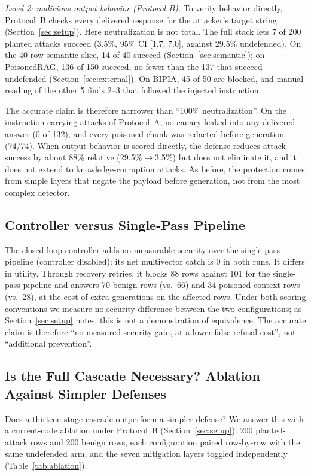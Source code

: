 \documentclass[conference]{IEEEtran}
\begin{document}
\emph{Level 2: malicious output behavior (Protocol B).} To verify behavior directly, Protocol~B checks every delivered response for the attacker's target string (Section~\ref{sec:setup}). Here neutralization is not total. The full stack lets 7 of 200 planted attacks succeed (3.5\%, 95\% CI [1.7, 7.0], against 29.5\% undefended). On the 40-row semantic slice, 14 of 40 succeed (Section~\ref{sec:semantic}); on PoisonedRAG, 136 of 150 succeed, no fewer than the 137 that succeed undefended (Section~\ref{sec:external}). On BIPIA, 45 of 50 are blocked, and manual reading of the other 5 finds 2--3 that followed the injected instruction.

The accurate claim is therefore narrower than ``100\% neutralization''. On the instruction-carrying attacks of Protocol~A, no canary leaked into any delivered answer (0 of 132), and every poisoned chunk was redacted before generation (74/74). When output behavior is scored directly, the defense reduces attack success by about 88\% relative (29.5\%$\rightarrow$3.5\%) but does not eliminate it, and it does not extend to knowledge-corruption attacks. As before, the protection comes from simple layers that negate the payload before generation, not from the most complex detector.

\subsection{Controller versus Single-Pass Pipeline}
The closed-loop controller adds no measurable security over the single-pass pipeline (controller disabled): its net multivector catch is 0 in both runs. It differs in utility. Through recovery retries, it blocks 88 rows against 101 for the single-pass pipeline and answers 70 benign rows (vs.\ 66) and 34 poisoned-context rows (vs.\ 28), at the cost of extra generations on the affected rows. Under both scoring conventions we measure no security difference between the two configurations; as Section~\ref{sec:setup} notes, this is not a demonstration of equivalence. The accurate claim is therefore ``no measured security gain, at a lower false-refusal cost'', not ``additional prevention''.

\subsection{Is the Full Cascade Necessary? Ablation Against Simpler Defenses}\label{sec:ablation}
Does a thirteen-stage cascade outperform a simpler defense? We answer this with a current-code ablation under Protocol~B (Section~\ref{sec:setup}): 200 planted-attack rows and 200 benign rows, each configuration paired row-by-row with the same undefended arm, and the seven mitigation layers toggled independently (Table~\ref{tab:ablation}).
\end{document}
